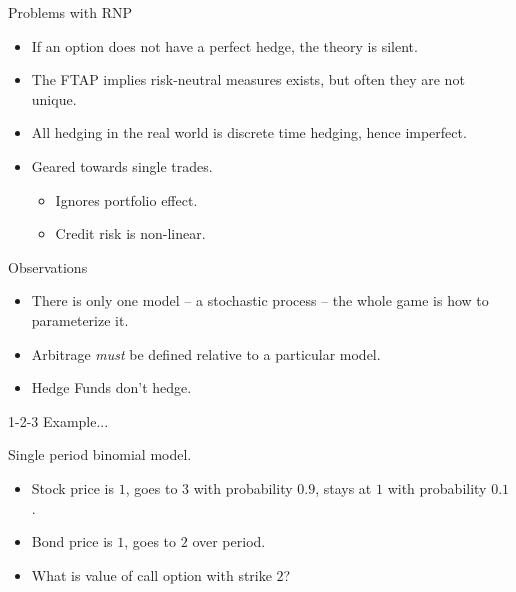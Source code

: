 \documentclass[fleqn]{amsart}
\begin{document}
\begin{section}{Problems with RNP}

\begin{itemize}

\item If an option does not have a perfect hedge, the theory
is silent.

\item The FTAP implies risk-neutral measures exists, but often
they are not unique.

\item All hedging in the real world is discrete time hedging, hence
imperfect.

\item Geared towards single trades.
\begin{itemize}
\item Ignores portfolio effect.
\item Credit risk is non-linear.
\end{itemize}

\end{itemize}

\end{section}

\begin{section}{Observations}

\begin{itemize}

\item There is only one model -- a stochastic process -- the whole
game is how to parameterize it.

\item Arbitrage {\em must} be defined relative to a particular model.

\item Hedge Funds don't hedge.

\end{itemize}

\end{section}

\begin{section}{1-2-3 Example{...}}

Single period binomial model.

\begin{itemize}

\item Stock price is $1$, goes to $3$ with probability $0.9$, stays at
$1$ with probability $0.1$.

\item Bond price is $1$, goes to $2$ over period.

\item What is value of call option with strike $2$?

\end{itemize}

\end{section}
\end{document}
